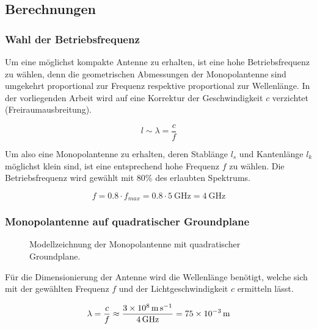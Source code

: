 \subsection{Berechnungen}

\subsubsection{Wahl der Betriebsfrequenz}
\label{sec:calculation_frequency}

Um eine möglichst kompakte Antenne zu erhalten, ist eine hohe
Betriebsfrequenz zu wählen, denn die geometrischen Abmessungen
der Monopolantenne sind umgekehrt proportional zur Frequenz
respektive proportional zur Wellenlänge. In der vorliegenden
Arbeit wird auf eine Korrektur der Geschwindigkeit $c$ verzichtet
(Freiraumausbreitung).

\begin{equation}
	l \sim \lambda = \frac{c}{f}
\end{equation}

Um also eine Monopolantenne zu erhalten, deren Stablänge $l_s$
und Kantenlänge $l_k$ möglichst klein sind, ist eine entsprechend
hohe Frequenz $f$ zu wählen. Die Betriebsfrequenz wird gewählt mit
80\% des erlaubten Spektrums.

\begin{equation}
	f
	= 0.8 \cdot f_{max}
	= 0.8 \cdot \SI{5}{\giga\hertz}
	= \SI{4}{\giga\hertz} 
\end{equation}

\subsubsection{Monopolantenne auf quadratischer Groundplane}

\begin{figure}[h!]
	\centering
	\def\svgwidth{0.5\textwidth}
	
	\caption{Modellzeichnung der Monopolantenne mit quadratischer
		Groundplane.}
\end{figure}

Für die Dimensionierung der Antenne wird die Wellenlänge benötigt,
welche sich mit der gewählten Frequenz $f$ und der Lichtgeschwindigkeit
$c$ ermitteln lässt.

\begin{equation}
	\lambda
	= \frac{c}{f}
	\approx \frac{\SI{3d8}{\meter\per\second}}{\SI{4}{\giga\hertz}}
	= \SI{75d-3}{\meter} 
\end{equation}

